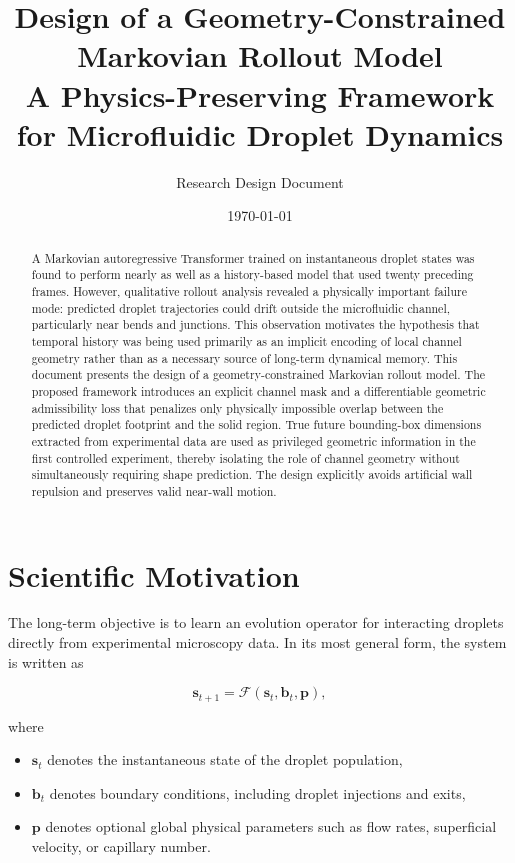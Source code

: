 \documentclass[11pt]{article}
\title{\textbf{Design of a Geometry-Constrained Markovian Rollout Model}\\
\large A Physics-Preserving Framework for Microfluidic Droplet Dynamics}
\author{Research Design Document}
\date{\today}
\begin{document}
\maketitle

\begin{abstract}
A Markovian autoregressive Transformer trained on instantaneous droplet states was found to perform nearly as well as a history-based model that used twenty preceding frames. However, qualitative rollout analysis revealed a physically important failure mode: predicted droplet trajectories could drift outside the microfluidic channel, particularly near bends and junctions. This observation motivates the hypothesis that temporal history was being used primarily as an implicit encoding of local channel geometry rather than as a necessary source of long-term dynamical memory. This document presents the design of a geometry-constrained Markovian rollout model. The proposed framework introduces an explicit channel mask and a differentiable geometric admissibility loss that penalizes only physically impossible overlap between the predicted droplet footprint and the solid region. True future bounding-box dimensions extracted from experimental data are used as privileged geometric information in the first controlled experiment, thereby isolating the role of channel geometry without simultaneously requiring shape prediction. The design explicitly avoids artificial wall repulsion and preserves valid near-wall motion.
\end{abstract}

\section{Scientific Motivation}

The long-term objective is to learn an evolution operator for interacting droplets directly from experimental microscopy data. In its most general form, the system is written as

\begin{equation}
    \bm{s}_{t+1}
    =
    \mathcal{F}\!\left(
    \bm{s}_{t},
    \bm{b}_{t},
    \bm{p}
    \right),
\end{equation}

where

\begin{itemize}[leftmargin=1.5em]
    \item $\bm{s}_{t}$ denotes the instantaneous state of the droplet population,
    \item $\bm{b}_{t}$ denotes boundary conditions, including droplet injections and exits,
    \item $\bm{p}$ denotes optional global physical parameters such as flow rates, superficial velocity, or capillary number.
\end{itemize}
\end{document}
